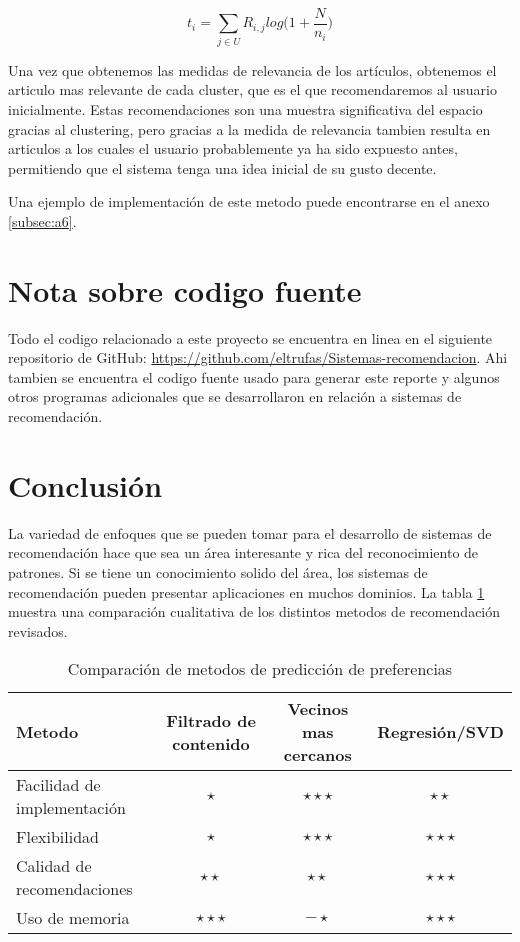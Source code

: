 \documentclass[11pt]{article}
\begin{document}
$$t_i = \sum\limits_{j\in U}R_{i, j}log\big(1 + \frac{N}{n_i}\big)$$

Una vez que obtenemos las medidas de relevancia de los artículos, obtenemos el
articulo mas relevante de cada cluster, que es el que recomendaremos al usuario
inicialmente. Estas recomendaciones son una muestra significativa del espacio
gracias al clustering, pero gracias a la medida de relevancia tambien resulta en
articulos a los cuales el usuario probablemente ya ha sido expuesto antes,
permitiendo que el sistema tenga una idea inicial de su gusto decente.

Una ejemplo de implementación de este metodo puede encontrarse en el anexo
\ref{subsec:a6}.

\section{Nota sobre codigo fuente}

Todo el codigo relacionado a este proyecto se encuentra en linea en el siguiente
repositorio de GitHub: \url{https://github.com/eltrufas/Sistemas-recomendacion}.
Ahi tambien se encuentra el codigo fuente usado para generar este reporte y
algunos otros programas adicionales que se desarrollaron en relación a sistemas
de recomendación.

\section{Conclusión} %



La variedad de enfoques que se pueden tomar para el desarrollo de sistemas de
recomendación hace que sea un área interesante y rica del reconocimiento de
patrones. Si se tiene un conocimiento solido del área, los sistemas de
recomendación pueden presentar aplicaciones en muchos dominios. La tabla
\ref{comparacion} muestra una comparación cualitativa de los distintos metodos
de recomendación revisados.


\begin{table}[t]
    \centering
    \begin{tabular}{|l|c|c|c|}
    \hline
    Metodo & Filtrado de contenido & Vecinos mas cercanos & Regresión/SVD\\
    \hline
    Facilidad de implementación & $\star$ & $\star\star\star$ & $\star\star$\\
    Flexibilidad & $\star$ & $\star\star\star$ & $\star\star\star$ \\
    Calidad de recomendaciones & $\star\star$ & $\star\star$ & $\star\star\star$ \\
    Uso de memoria & $\star\star\star$ & $-\star$ & $\star\star\star$ \\
    \hline
    \end{tabular}
    \caption{Comparación de metodos de predicción de preferencias}
    \label{comparacion}
    \end{table}
   
\end{document}
